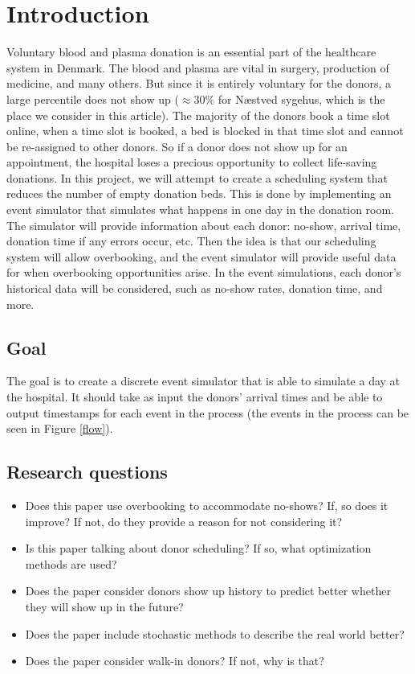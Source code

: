 \documentclass[a4paper,12pt]{article}
\begin{document}

\section{Introduction}

Voluntary blood and plasma donation is an essential part of the healthcare system in Denmark. The blood and plasma are vital in surgery, production of medicine, and many others. But since it is entirely voluntary for the donors, a large percentile does not show up ($\approx 30\%$ for Næstved sygehus, which is the place we consider in this article). The majority of the donors book a time slot online, when a time slot is booked, a bed is blocked in that time slot and cannot be re-assigned to other donors. So if a donor does not show up for an appointment, the hospital loses a precious opportunity to collect life-saving donations. In this project, we will attempt to create a scheduling system that reduces the number of empty donation beds. This is done by implementing an event simulator that simulates what happens in one day in the donation room. The simulator will provide information about each donor: no-show, arrival time, donation time if any errors occur, etc. Then the idea is that our scheduling system will allow overbooking, and the event simulator will provide useful data for when overbooking opportunities arise. In the event simulations, each donor's historical data will be considered, such as no-show rates, donation time, and more.





\subsection{Goal}

The goal is to create a discrete event simulator that is able to simulate a day at the hospital. It should take as input the donors' arrival times and be able to output timestamps for each event in the process (the events in the process can be seen in Figure \ref{flow}).



\subsection{Research questions}

\begin{itemize}
    \item Does this paper use overbooking to accommodate no-shows? If, so does it improve? If not, do they provide a reason for not considering it?
    \item Is this paper talking about donor scheduling? If so, what optimization methods are used?
    \item Does the paper consider donors show up history to predict better whether they will show up in the future?
    \item Does the paper include stochastic methods to describe the real world better?
    \item Does the paper consider walk-in donors? If not, why is that?
\end{itemize}
\end{document}
